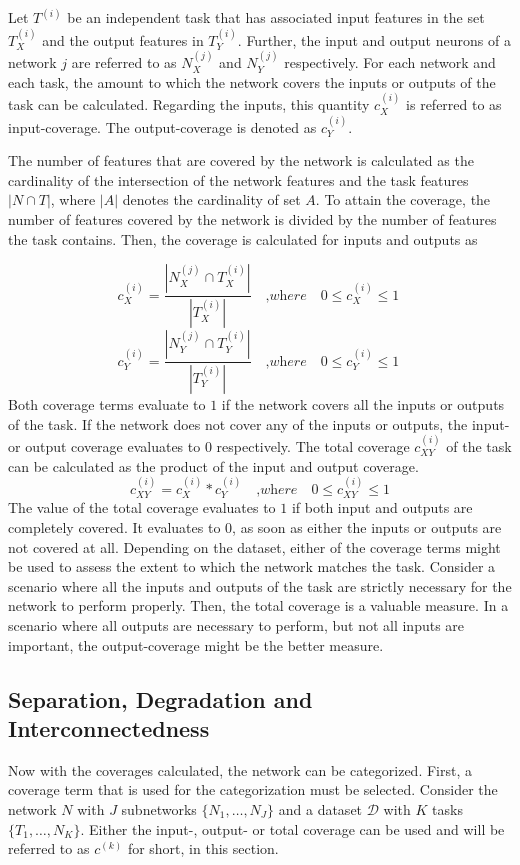Let $T^{(i)}$ be an independent task that has associated input features in the set $T^{(i)}_X$ and the output features in $T^{(i)}_Y$.
Further, the input and output neurons of a network $j$ are referred to as $N^{(j)}_X$ and $N^{(j)}_Y$ respectively.
For each network and each task, the amount to which the network covers the inputs or outputs of the task can be calculated.
Regarding the inputs, this quantity $c^{(i)}_X$ is referred to as input-coverage. The output-coverage is denoted as $c^{(i)}_Y$.

The number of features that are covered by the network is calculated as the cardinality of the intersection of the network features and the task features $ |N \cap T|$, where  $|A|$ denotes the cardinality of set $A$.
To attain the coverage, the number of features covered by the network is divided by the number of features the task contains.
Then, the coverage is calculated for inputs and outputs as 

\[
c^{(i)}_X = \frac{|N^{(j)}_X  \cap T^{(i)}_X |}{|T^{(i)}_X|} \quad\textit{,where}\quad 0 \leq c^{(i)}_{X} \leq 1\
\]
\[
c^{(i)}_Y = \frac{|N^{(j)}_Y  \cap T^{(i)}_Y |}{|T^{(i)}_Y|} \quad\textit{,where}\quad 0 \leq c^{(i)}_{Y} \leq 1\
\]
Both coverage terms evaluate to $1$ if the network covers all the inputs or outputs of the task.
If the network does not cover any of the inputs or outputs, the input- or output coverage evaluates to $0$ respectively.
The total coverage $c^{(i)}_{XY}$ of the task can be calculated as the product of the input and output coverage.
\[ c^{(i)}_{XY} = c^{(i)}_{X} * c^{(i)}_{Y} \quad\textit{,where}\quad 0 \leq c^{(i)}_{XY} \leq 1\]
The value of the total coverage evaluates to $1$ if both input and outputs are completely covered.
It evaluates to $0$, as soon as either the inputs or outputs are not covered at all.
Depending on the dataset, either of the coverage terms might be used to assess the extent to which the network matches the task.
Consider a scenario where all the inputs and outputs of the task are strictly necessary for the network to perform properly.
Then, the total coverage is a valuable measure.
In a scenario where all outputs are necessary to perform, but not all inputs are important, the output-coverage might be the better measure.

\subsection{Separation, Degradation and Interconnectedness}
Now with the coverages calculated, the network can be categorized.
First, a coverage term that is used for the categorization must be selected.
Consider the network $N$ with $J$ subnetworks $\{N_1, \dots, N_J\}$ and a dataset $\mathcal{D}$ with $K$ tasks $\{T_1, \dots, N_K\}$.
Either the input-, output- or total coverage can be used and will be referred to as $c^{(k)}$ for short, in this section.

